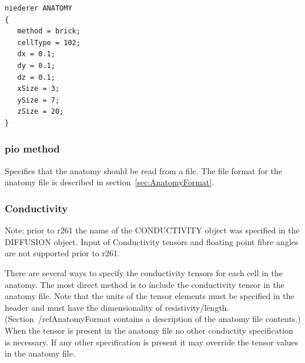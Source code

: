 \documentclass{article}
\begin{document}

\begin{keywords}
\end{keywords}

\begin{verbatim}
niederer ANATOMY 
{
   method = brick;
   cellType = 102;
   dx = 0.1;
   dy = 0.1;
   dz = 0.1;
   xSize = 3; 
   ySize = 7;
   zSize = 20;
}
\end{verbatim}

\subsubsection{pio method}

Specifies that the anatomy should be read from a file.    The file format for the anatomy file is described in
section~\ref{sec:AnatomyFormat}. 
\begin{keywords}
\end{keywords}

\subsubsection{Conductivity}
Note: prior to r261 the name of the CONDUCTIVITY object was specified in
the DIFFUSION object.  Input of Conductivity tensors and floating point
fibre angles are not supported prior to r261.

There are several ways to specify the conductivity tensors for each cell
in the anatomy.  The most direct method is to include the conductivity
tensor in the anatomy file.  Note that the units of the tensor elements
must be specified in the header and must have the dimensionality of
resistivity/length.  (Section~/ref{AnatomyFormat} contains a description
of the anatomy file contents.)  When the tensor is present in the
anatomy file no other conductity specification is necessary.  If any
other specification is present it may override the tensor values in the
anatomy file.
\end{document}
